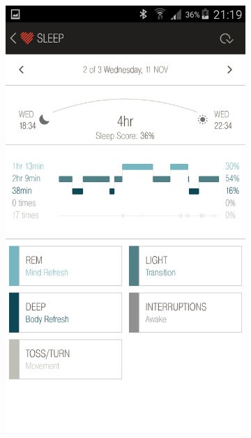 \documentclass[12pt,a4paper]{article}
\begin{document}
\newpage

\begin{figure}[H]
    \begin{subfigure}[b]{0.5\textwidth}
        \includegraphics[width=\textwidth]{11-11-15-2.png}
     \end{subfigure}
    ~ %
    \begin{subfigure}[b]{0.5\textwidth}

\end{subfigure}
\end{figure}
\end{document}
